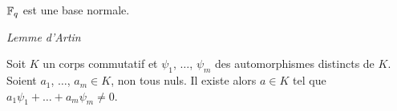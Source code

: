 \documentclass[12pt,a4paper]{article}
\begin{document}
\begin{flushleft}
\begin{thm}
$\mathbb{F}_q$ est une base normale.
\end{thm}

\textit{Lemme d'Artin}
\begin{thm}
Soit $K$ un corps commutatif et $\psi_1$, $\ldots$, $\psi_m$ des automorphismes distincts de $K$. Soient $a_1$, $\ldots$, $a_m \in K$, non tous nuls. Il existe alors $a \in K$ tel que $a_1 \psi_1 + \ldots + a_m \psi_m \neq 0$.
\end{thm}




\end{flushleft}


 
\end{document}
